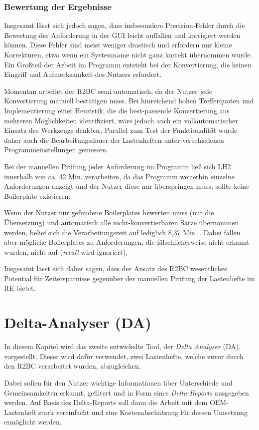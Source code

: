 \documentclass[12pt]{report}
\begin{document}
\subsection{Bewertung der Ergebnisse}
Insgesamt lässt sich jedoch sagen, dass insbesondere Precision-Fehler durch die Bewertung der Anforderung in der GUI leicht auffallen und korrigiert werden können. Diese Fehler sind meist weniger drastisch und erfordern nur kleine Korrekturen, etwa wenn ein Systemname nicht ganz korrekt übernommen wurde. Ein Großteil der Arbeit im Programm entsteht bei der Konvertierung, die keinen Eingriff und Aufmerksamkeit des Nutzers erfordert.  

Momentan arbeitet der R2BC semi-automatisch, da der Nutzer jede Konvertierung manuell bestätigen muss. Bei hinreichend hohen Trefferquoten und Implementierung einer Heuristik, die die best-passende Konvertierung aus mehreren Möglichkeiten identifiziert, wäre jedoch auch ein vollautomatischer Einsatz des Werkzeugs denkbar. Parallel zum Test der Funktionalität wurde daher auch die Bearbeitungsdauer der Lastenheften unter verschiedenen Programmeinstellungen gemessen. 

Bei der manuellen Prüfung jeder Anforderung im Programm ließ sich LH2 innerhalb von ca. 42 Min. verarbeiten, da das Programm weiterhin einzelne Anforderungen anzeigt und der Nutzer diese nur überspringen muss, sollte keine Boilerplate existieren. 

Wenn der Nutzer nur gefundene Boilerplates bewerten muss (nur die Übersetzung) und automatisch alle nicht-konvertierbaren Sätze übernommen werden, belief sich die Verarbeitungszeit auf lediglich 8,37 Min. . Dabei fallen aber mögliche Boilerplates zu Anforderungen, die fälschlicherweise nicht erkannt wurden, nicht auf (\textit{recall} wird ignoriert).

Insgesamt lässt sich daher sagen, dass der Ansatz des R2BC wesentliches Potential für Zeitersparnisse gegenüber der manuellen Prüfung der Lastenhefte im RE bietet.

\chapter{Delta-Analyser (DA)}
In diesem Kapitel wird das zweite entwickelte Tool, der \textit{Delta Analyser} (DA), vorgestellt. Dieser wird dafür verwendet, zwei Lastenhefte, welche zuvor durch den R2BC verarbeitet wurden, abzugleichen. 

Dabei sollen für den Nutzer wichtige Informationen über Unterschiede und Gemeinsamkeiten erkannt, gefiltert und in Form eines \textit{Delta-Reports} ausgegeben werden. Auf Basis des Delta-Reports soll dann die Arbeit mit dem OEM-Lastenheft stark vereinfacht und eine Kostenabschätzung für dessen Umsetzung ermöglicht werden. 
\end{document}
